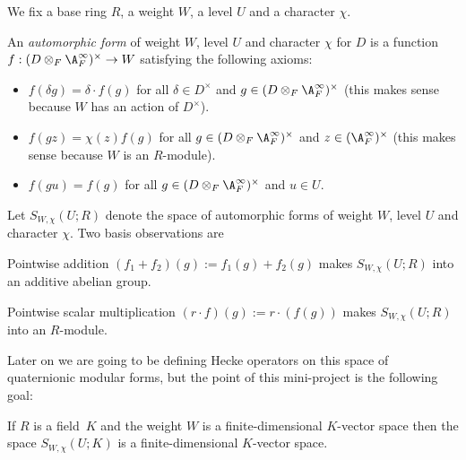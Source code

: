 We fix a base ring $R$, a weight $W$, a level $U$ and a character $\chi$.

\begin{definition}
  \label{TotallyDefiniteQuaternionAlgebra.AutomorphicForm}
  \leanok
  An \emph{automorphic form} of weight $W$, level $U$ and character $\chi$ for $D$ is
  a function $f:(D\otimes_F\A_F^\infty)^\times\to W$ satisfying the following axioms:
  \begin{itemize}
    \item $f(\delta g)=\delta\cdot f(g)$ for all $\delta\in D^\times$ and $g\in (D\otimes_F\A_F^\infty)^\times$
    (this makes sense because $W$ has an action of $D^\times$).
    \item $f(gz)=\chi(z)f(g)$ for all $g\in (D\otimes_F\A_F^\infty)^\times$ and $z\in(\A_F^\infty)^\times$
    (this makes sense because $W$ is an $R$-module).
    \item $f(gu)=f(g)$ for all $g\in (D\otimes_F\A_F^\infty)^\times$ and $u\in U$.
  \end{itemize}
\end{definition}

Let $S_{W,\chi}(U;R)$ denote the space of automorphic forms of weight $W$, level $U$ and character
$\chi$. Two basis observations are

\begin{definition}
  \label{TotallyDefiniteQuaternionAlgebra.AutomorphicForm.addCommGroup}
  Pointwise addition $(f_1+f_2)(g):=f_1(g)+f_2(g)$ makes $S_{W,\chi}(U;R)$ into an additive
  abelian group.
\end{definition}

\begin{definition}
  \label{TotallyDefiniteQuaternionAlgebra.AutomorphicForm.module}
  Pointwise scalar multiplication $(r\cdot f)(g):= r\cdot(f(g))$ makes
  $S_{W,\chi}(U;R)$ into an $R$-module.
\end{definition}

  Later on we are going to be defining Hecke operators on this space of quaternionic modular
  forms, but the point of this mini-project is the following goal:

\begin{theorem}
  \label{TotallyDefiniteQuaternionAlgebra.AutomorphicForm.finiteDimensional}
  If $R$ is a field~$K$ and the weight $W$ is a finite-dimensional $K$-vector space
  then the space $S_{W,\chi}(U;K)$ is a finite-dimensional $K$-vector space.
\end{theorem}


